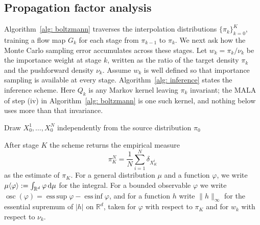 \documentclass{article}
\begin{document}
\subsection{Propagation factor analysis}
\label{sec: propagation-analysis}

Algorithm~\ref{alg: boltzmann} traverses the interpolation distributions $\{\pi_k\}_{k=0}^K$, training a flow map $G_k$ for each stage from $\pi_{k-1}$ to $\pi_k$. We next ask how the Monte Carlo sampling error accumulates across these stages. Let $w_k = \pi_k/\nu_k$ be the importance weight at stage $k$, written as the ratio of the target density $\pi_k$ and the pushforward density $\nu_k$. Assume $w_k$ is well defined so that importance sampling is available at every stage. {\color{blue}Algorithm~\ref{alg: inference} states the inference scheme.} Here $Q_k$ is any Markov kernel leaving $\pi_k$ invariant; the MALA of step (iv) in Algorithm~\ref{alg: boltzmann} is one such kernel, and nothing below uses more than that invariance.

\begin{algorithm}[htb]
\color{blue}
\caption{{\color{blue}Inference scheme of the Boltzmann generator}}
\label{alg: inference}
Draw $X_0^1,\dots,X_0^N$ independently from the source distribution $\pi_0$\;
\end{algorithm}

After stage $K$ the scheme returns the empirical measure
\begin{equation}
	\pi_K^N = \frac1N\sum_{i=1}^{N} \delta_{X_K^i}
\end{equation}
as the estimate of $\pi_K$. For a general distribution $\mu$ and a function $\varphi$, we write $\mu\langle \varphi\rangle := \int_{\mathbb R^d} \varphi \, \mathrm{d}\mu$ for the integral. For a bounded observable $\varphi$ we write $\operatorname{osc}(\varphi) = \operatorname{ess\,sup}\varphi - \operatorname{ess\,inf}\varphi$, and for a function $h$ write $\lVert h \rVert_\infty$ for the essential supremum of $|h|$ on $\mathbb R^d$, taken for $\varphi$ with respect to $\pi_K$ and for $w_k$ with respect to $\nu_k$.
\end{document}
